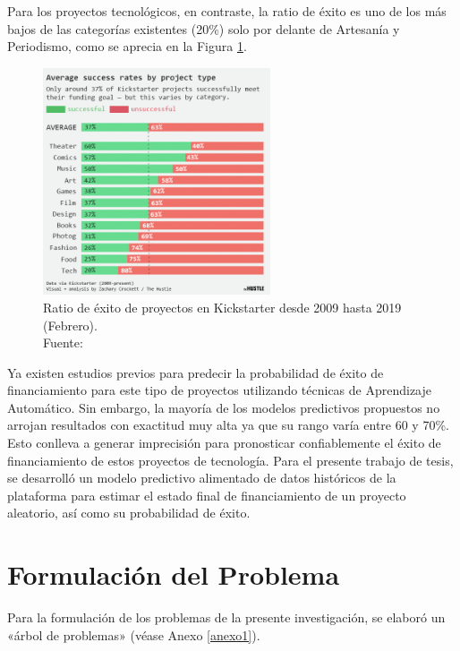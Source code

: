 Para los proyectos tecnológicos, en contraste, la ratio de éxito es uno de los más bajos de las categorías existentes (20\%) solo por delante de Artesanía y Periodismo, como se aprecia en la Figura \ref{1:fig2}.
\begin{figure}[h]
	\begin{center}
		\includegraphics[width=0.6\textwidth]{1/figures/kickstarter_success_rate_2009_2019.jpg}
		\caption[Ratio de éxito de proyectos en Kickstarter desde 2009 hasta 2019 (Febrero)]{Ratio de éxito de proyectos en Kickstarter desde 2009 hasta 2019 (Febrero).\\
		Fuente: \cite{cr_hustle2019successrate}}
		\label{1:fig2}
	\end{center}
\end{figure}


Ya existen estudios previos para predecir la probabilidad de éxito de financiamiento para este tipo de proyectos utilizando técnicas de Aprendizaje Automático. Sin embargo, la mayoría de los modelos predictivos propuestos no arrojan resultados con exactitud muy alta ya que su rango varía entre 60 y 70\%. Esto conlleva a generar imprecisión para pronosticar confiablemente el éxito de financiamiento de estos proyectos de tecnología. Para el presente trabajo de tesis, se desarrolló un modelo predictivo alimentado de datos históricos de la plataforma para estimar el estado final de financiamiento de un proyecto aleatorio, así como su probabilidad de éxito. 



\section{Formulación del Problema}
Para la formulación de los problemas de la presente investigación, se elaboró un «árbol de problemas» (véase Anexo \ref{anexo1}).

